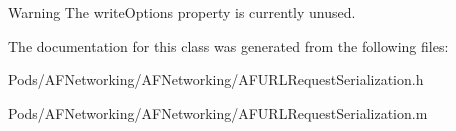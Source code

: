 \begin{DoxyWarning}{Warning}
The {\ttfamily write\+Options} property is currently unused. 
\end{DoxyWarning}


The documentation for this class was generated from the following files\+:\begin{DoxyCompactItemize}
\item 
Pods/\+A\+F\+Networking/\+A\+F\+Networking/A\+F\+U\+R\+L\+Request\+Serialization.\+h\item 
Pods/\+A\+F\+Networking/\+A\+F\+Networking/A\+F\+U\+R\+L\+Request\+Serialization.\+m\end{DoxyCompactItemize}

